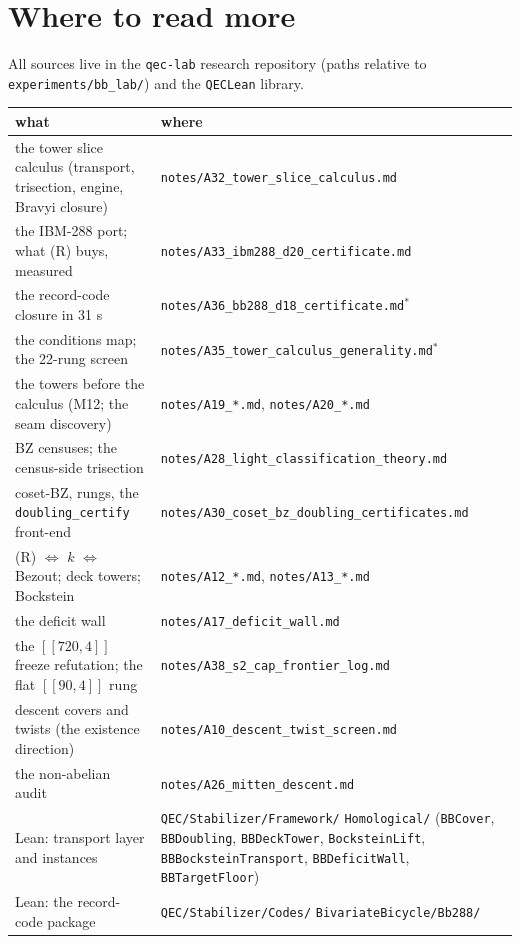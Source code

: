 \documentclass[11pt]{article}
\theoremstyle{plain}
\theoremstyle{definition}
\theoremstyle{remark}
\begin{document}
\section{Where to read more}
\label{sec:further}

All sources live in the \texttt{qec-lab} research repository (paths
relative to \texttt{experiments/bb\_lab/}) and the \texttt{QECLean}
library.

\begin{center}
\footnotesize
\begin{tabular}{@{}>{\raggedright\arraybackslash}p{}@{\quad}>{\raggedright\arraybackslash}p{}@{}}
\toprule
what & where\\
\midrule
the tower slice calculus (transport, trisection, engine, Bravyi
closure) & \texttt{notes/A32\_tower\_slice\_calculus.md}\\
the IBM-288 port; what (R) buys, measured &
\texttt{notes/A33\_ibm288\_d20\_certificate.md}\\
the record-code closure in 31 s &
\texttt{notes/A36\_bb288\_d18\_certificate.md}$^\ast$\\
the conditions map; the 22-rung screen &
\texttt{notes/A35\_tower\_calculus\_generality.md}$^\ast$\\
the towers before the calculus (M12; the seam discovery) &
\texttt{notes/A19\_*.md}, \texttt{notes/A20\_*.md}\\
BZ censuses; the census-side trisection &
\texttt{notes/A28\_light\_classification\_theory.md}\\
coset-BZ, rungs, the \texttt{doubling\_certify} front-end &
\texttt{notes/A30\_coset\_bz\_doubling\_certificates.md}\\
(R) $\Leftrightarrow$ $k$ $\Leftrightarrow$ Bezout; deck towers;
Bockstein & \texttt{notes/A12\_*.md}, \texttt{notes/A13\_*.md}\\
the deficit wall & \texttt{notes/A17\_deficit\_wall.md}\\
the $[[720,4]]$ freeze refutation; the flat $[[90,4]]$ rung &
\texttt{notes/A38\_s2\_cap\_frontier\_log.md}\\
descent covers and twists (the existence direction) &
\texttt{notes/A10\_descent\_twist\_screen.md}\\
the non-abelian audit & \texttt{notes/A26\_mitten\_descent.md}\\
Lean: transport layer and instances &
\texttt{QEC/Stabilizer/Framework/} \texttt{Homological/}
(\texttt{BBCover}, \texttt{BBDoubling}, \texttt{BBDeckTower},
\texttt{BocksteinLift}, \texttt{BBBocksteinTransport},
\texttt{BBDeficitWall}, \texttt{BBTargetFloor})\\
Lean: the record-code package &
\texttt{QEC/Stabilizer/Codes/} \texttt{BivariateBicycle/Bb288/}\\
\bottomrule
\end{tabular}
\end{center}
\end{document}
